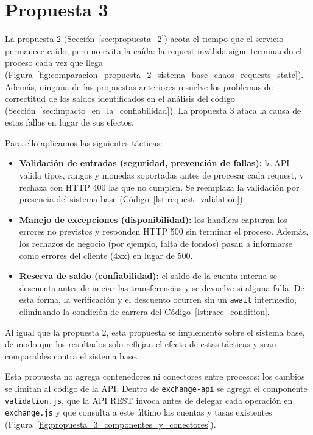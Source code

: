 \section{Propuesta 3}
\label{sec:propuesta_3}

    La propuesta 2 (Sección~\ref{sec:propuesta_2}) acota el tiempo que el servicio permanece caído, pero no evita la caída:
    la request inválida sigue terminando el proceso cada vez que llega (Figura~\ref{fig:comparacion_propuesta_2_sistema_base_chaos_requests_state}).
    Además, ninguna de las propuestas anteriores resuelve los problemas de correctitud de los saldos identificados en el análisis
    del código (Sección~\ref{sec:impacto_en_la_confiabilidad}). La propuesta 3 ataca la causa de estas fallas en lugar de sus efectos.

    Para ello aplicamos las siguientes tácticas:

    \begin{itemize}
        \item \textbf{Validación de entradas (seguridad, prevención de fallas):} la API valida tipos, rangos y monedas soportadas
        antes de procesar cada request, y rechaza con HTTP 400 las que no cumplen. Se reemplaza la validación por presencia
        del sistema base (Código~\ref{lst:request_validation}).
        \item \textbf{Manejo de excepciones (disponibilidad):} los handlers capturan los errores no previstos y responden HTTP 500
        sin terminar el proceso. Además, los rechazos de negocio (por ejemplo, falta de fondos) pasan a informarse como errores
        del cliente (4xx) en lugar de 500.
        \item \textbf{Reserva de saldo (confiabilidad):} el saldo de la cuenta interna se descuenta antes de iniciar las
        transferencias y se devuelve si alguna falla. De esta forma, la verificación y el descuento ocurren sin un \texttt{await}
        intermedio, eliminando la condición de carrera del Código~\ref{lst:race_condition}.
    \end{itemize}

    Al igual que la propuesta 2, esta propuesta se implementó sobre el sistema base, de modo que los resultados solo reflejan
    el efecto de estas tácticas y sean comparables contra el sistema base.

    Esta propuesta no agrega contenedores ni conectores entre procesos: los cambios se limitan al código de la API.
    Dentro de \texttt{exchange-api} se agrega el componente \texttt{validation.js}, que la API REST invoca antes de delegar cada operación en \texttt{exchange.js} y que consulta a este último las cuentas y tasas existentes (Figura~\ref{fig:propuesta_3_componentes_y_conectores}).

